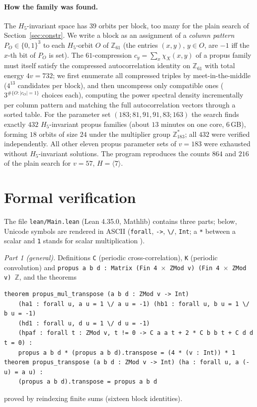 \documentclass[11pt]{article}
\numberwithin{equation}{section}
\theoremstyle{definition}
\theoremstyle{remark}
\newcommand{\Z}{\mathbb Z}
\begin{document}
\paragraph{How the family was found.} The $H_5$-invariant space has $39$ orbits per block, too many
for the plain search of Section~\ref{sec:constr}. We write a block as an assignment of a
\emph{column pattern} $P_O\in\{0,1\}^{3}$ to each $H_5$-orbit $O$ of $\Z_{61}$ (the entries $(x,y)$,
$y\in O$, are $-1$ iff the $x$-th bit of $P_O$ is set). The $61$-compression $c_y=\sum_x\chi_X(x,y)$ of a
propus family must itself satisfy the compressed autocorrelation identity on $\Z_{61}$ with total energy
$4v=732$; we first enumerate all compressed triples by meet-in-the-middle ($4^{13}$ candidates per
block), and then uncompress only compatible ones ($3^{\#\{O:|c_O|=1\}}$ choices each), computing the
power spectral density incrementally per column pattern and matching the full autocorrelation vectors
through a sorted table. For the parameter set $(183;81,91,91,83;163)$ the search finds exactly $432$
$H_5$-invariant propus families (about $13$ minutes on one core, $6$\,GB), forming $18$ orbits of size
$24$ under the multiplier group $\Z_{183}^{*}$; all $432$ were verified independently. All other
eleven propus parameter sets of $v=183$ were exhausted without $H_5$-invariant solutions. The program reproduces the counts $864$ and $216$ of the plain search for
$v=57$, $H=\langle7\rangle$.

\section{Formal verification}\label{sec:lean}
The file \texttt{lean/Main.lean} (Lean 4.35.0, Mathlib) contains three parts; below, Unicode symbols are rendered in ASCII
(\texttt{forall}, \texttt{->}, \texttt{\textbackslash/}, \texttt{Int}; a \texttt{*} between a scalar and \texttt{1} stands for scalar multiplication \texttt{\textbullet}).

\emph{Part 1 (general).} Definitions \texttt{C} (periodic cross-correlation), \texttt{K} (periodic
convolution) and \texttt{propus a b d : Matrix (Fin 4 $\times$ ZMod v) (Fin 4 $\times$ ZMod v) $\mathbb Z$}, and the theorems
\begin{verbatim}
theorem propus_mul_transpose (a b d : ZMod v -> Int)
    (ha1 : forall u, a u = 1 \/ a u = -1) (hb1 : forall u, b u = 1 \/ b u = -1)
    (hd1 : forall u, d u = 1 \/ d u = -1)
    (hpaf : forall t : ZMod v, t != 0 -> C a a t + 2 * C b b t + C d d t = 0) :
    propus a b d * (propus a b d).transpose = (4 * (v : Int)) * 1
theorem propus_transpose (a b d : ZMod v -> Int) (ha : forall u, a (-u) = a u) :
    (propus a b d).transpose = propus a b d
\end{verbatim}
proved by reindexing finite sums (sixteen block identities).
\end{document}
